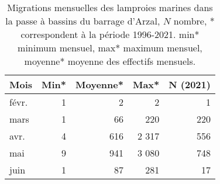 \begin{table}[htbp]
\centering
\begin{tabular}{lrrrr}
  \hline
Mois & Min* & Moyenne* & Max* & N (2021) \\ 
  \hline
  févr. & 1 & 2 & 2 & 1 \\ 
  mars & 1 & 66 & 220 & 220 \\ 
  avr. & 4 & 616 & 2 317 & 556 \\ 
  mai & 9 & 941 & 3 080 & 748 \\ 
  juin & 1 & 87 & 281 & 17 \\ 
   \hline
\end{tabular}
\caption{Migrations mensuelles des lamproies marines dans la passe à bassins du barrage d'Arzal, $N$ nombre, * correspondent à
				la période 1996-2021. min* minimum mensuel, max* maximum mensuel, moyenne* moyenne des effectifs mensuels.} 
\label{table_lpm_mois}
\end{table}
